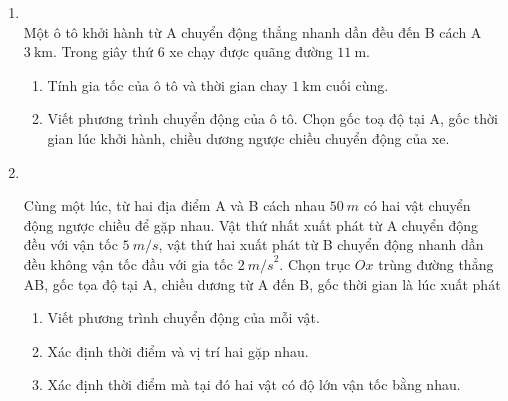 \begin{enumerate}[label=\bfseries Bài \arabic*:,leftmargin=1.5cm]
\item {}\\
Một ô tô khởi hành từ A chuyển động thẳng nhanh dần đều đến B cách A $\SI{3}{\kilo\meter}$. Trong giây thứ 6 xe chạy được quãng đường $\SI{11}{\meter}$.
\begin{enumerate}[label=\alph*)]
	\item Tính gia tốc của ô tô và thời gian chay $\SI{1}{\kilo\meter}$ cuối cùng.
	\item Viết phương trình chuyển động của ô tô. Chọn gốc toạ độ tại A, gốc thời gian lúc khởi hành, chiều dương ngược chiều chuyển động của xe.
\end{enumerate}

\item {}\\
{Cùng một lúc, từ hai địa điểm A và B cách nhau $\SI{50}{m}$ có hai vật chuyển động ngược chiều để gặp nhau. Vật thứ nhất xuất phát từ A chuyển động đều với vận tốc $\SI{5}{m/s}$, vật thứ hai xuất phát từ B chuyển động nhanh dần đều không vận tốc đầu với gia tốc $\SI{2}{m/s}^2$. Chọn trục $Ox$ trùng đường thẳng AB, gốc tọa độ tại A, chiều dương từ A đến B, gốc thời gian là lúc xuất phát
	\begin{enumerate}[label=\alph*.]
		\item Viết phương trình chuyển động của mỗi vật.
		\item Xác định thời điểm và vị trí hai gặp nhau.
		\item Xác định thời điểm mà tại đó hai vật có độ lớn vận tốc bằng nhau.
	\end{enumerate}
}
\end{enumerate}
